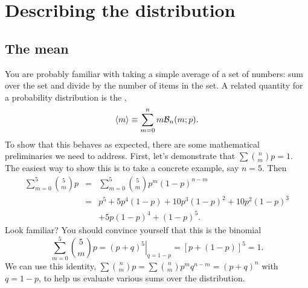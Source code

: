 \section{Describing the distribution}
\subsection{The mean}

You are probably familiar with taking a simple average of a set of numbers: sum over the set and divide by the number of items in the set.  A related quantity for a probability distribution is the ,
\begin{equation}\label{e.mean}
 \left\langle m\right\rangle \equiv \sum_{m=0}^{n} m\mathcal{B}_{n}(m;p).
\end{equation}
To show that this behaves as expected, there are some mathematical preliminaries we need to address.  First, let's demonstrate that $\sum\binom{n}{m}{p} = 1$.  The easiest way to show this is to take a concrete example, say $n=5$.  Then
\begin{eqnarray*} \sum_{m=0}^{5}\binom{5}{m}{p} &=& \sum_{m=0}^{5}{5\choose m}p^{m}(1-p)^{n-m}\\
	&=&	p^{5}+5p^{4}(1-p)+10p^{3}(1-p)^{2}+10p^{2}(1-p)^{3}\\
	&& +5p(1-p)^{4}+(1-p)^{5}.
\end{eqnarray*}
Look familiar?  You should convince yourself that this is the binomial
\[ \sum_{m=0}^{5}\binom{5}{m}{p} = \left.\left(p+q\right)^{5}\right|_{q=1-p}
	= \left[p + \left(1-p\right)\right]^{5} = 1. \]
We can use this identity, $\sum\binom{n}{m}{p}=\sum{n\choose m}p^{m}q^{n-m} = (p+q)^{n}$ with $q=1-p$, to help us evaluate various sums over the distribution.

